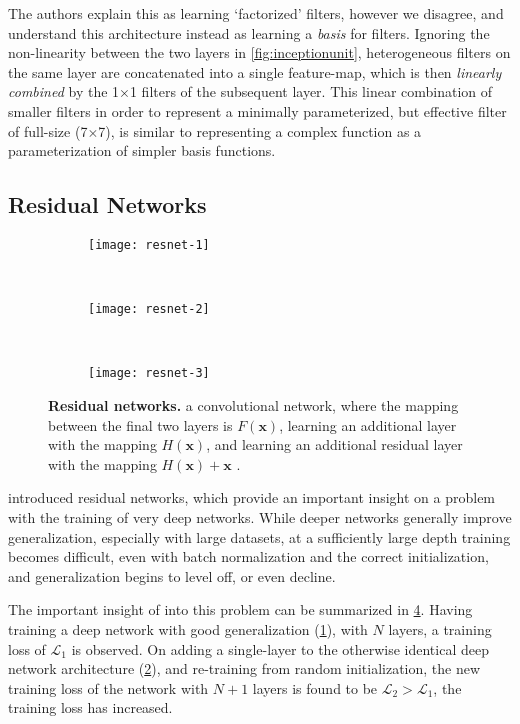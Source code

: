 \documentclass[thesis]{subfiles}
\begin{document}
The authors explain this as learning `factorized' filters, however we disagree, and understand this architecture instead as learning a \emph{basis} for filters. Ignoring the non-linearity between the two layers in \cref{fig:inceptionunit}, heterogeneous filters on the same layer are concatenated into a single feature-map, which is then \emph{linearly combined} by the 1$\times$1 filters of the subsequent layer. This linear combination of smaller filters in order to represent a minimally parameterized, but effective filter of full-size (7$\times$7), is similar to representing a complex function as a parameterization of simpler basis functions.

\subsection{Residual Networks}\label{residualnetworks}
\begin{figure}[tbp]
\begin{subfigure}[T]{0.32\textwidth}
\centering
\texttt{[image: resnet-1]}
\caption{}\label{fig:resnet-1}
\end{subfigure}
~
\begin{subfigure}[T]{0.32\textwidth}
\centering
\texttt{[image: resnet-2]}
\caption{}\label{fig:resnet-2}
\end{subfigure}
~
\begin{subfigure}[T]{0.32\textwidth}
\centering
\texttt{[image: resnet-3]}
\caption{}\label{fig:resnet-3}
\end{subfigure}
\caption[Residual networks.]{\textbf{Residual networks.}  a convolutional network, where the mapping between the final two layers is $F(\mathbf{x})$,  learning an additional layer with the mapping $H(\mathbf{x})$, and  learning an additional residual layer with the mapping $H(\mathbf{x})+\mathbf{x}$ .}
\label{fig:resnet}
\end{figure}
\citet{He2015} introduced residual networks, which provide an important insight on a problem with the training of very deep networks. While deeper networks generally improve generalization, especially with large datasets, at a sufficiently large depth training becomes difficult, even with batch normalization and the correct initialization, and generalization begins to level off, or even decline.

The important insight of \citet{He2015} into this problem can be summarized in \cref{fig:resnet}. Having training a deep network with good generalization (\eg{}\cref{fig:resnet-1}), with $N$ layers, a training loss of $\mathcal{L}_1$ is observed. On adding a single-layer to the otherwise identical deep network architecture (\eg{}\cref{fig:resnet-2}), and re-training from random initialization, the new training loss of the network with $N+1$ layers is found to be $\mathcal{L}_2 > \mathcal{L}_1$, \ie the training loss has increased.
\end{document}
